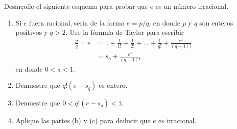\item Desarrolle el siguiente esquema para probar que $e$ es un número irracional.
    \begin{enumerate}
        \item[(a)] Si $e$ fuera racional, sería de la forma $e = p/q$, en donde $p$ y $q$ son enteros positivos y $q > 2$. Use la fórmula de Taylor para escribir
        \begin{align*}
            \frac{p}{q} = e &= 1 + \frac{1}{1!} + \frac{1}{2!} + \dots + \frac{1}{q!} + \frac{e^z}{(q+1)!} \\
            &= s_q + \frac{e^z}{(q+1)!}
        \end{align*}
        en donde $0 < z < 1$.
        \item[(b)] Demuestre que $q!(e - s_q)$ es entero.
        \item[(c)] Demuestre que $0 < q!(e - s_q) < 1$.
        \item[(d)] Aplique las partes (b) y (c) para deducir que $e$ es irracional.
    \end{enumerate}
